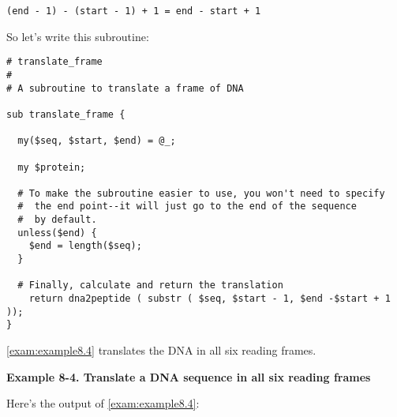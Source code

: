 \begin{lstlisting}
(end - 1) - (start - 1) + 1 = end - start + 1
\end{lstlisting}

So let's write this subroutine:

\begin{lstlisting}
# translate_frame
#
# A subroutine to translate a frame of DNA

sub translate_frame {

  my($seq, $start, $end) = @_;

  my $protein;

  # To make the subroutine easier to use, you won't need to specify
  #  the end point--it will just go to the end of the sequence
  #  by default.
  unless($end) {
    $end = length($seq);
  }

  # Finally, calculate and return the translation
    return dna2peptide ( substr ( $seq, $start - 1, $end -$start + 1 ));
}
\end{lstlisting}

\autoref{exam:example8.4} translates the DNA in all six reading frames. 

\textbf{Example 8-4. Translate a DNA sequence in all six reading frames}


Here's the output of \autoref{exam:example8.4}:

